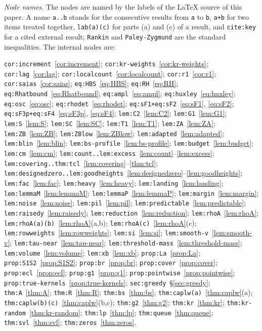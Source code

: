 \emph{Node names.} The nodes are named by the labels of the \LaTeX{} source of this paper. A name \texttt{a..b} stands for the
consecutive results from \texttt{a} to \texttt{b}, \texttt{a+b} for two items treated together, \texttt{lab(a)(c)} for parts (a)
and (c) of a result, and \texttt{cite:key} for a cited external result; \texttt{Rankin} and \texttt{Paley-Zygmund} are the standard
inequalities. The internal nodes are:
{\footnotesize\raggedright
\texttt{cor:increment}~\ref{cor:increment};
\texttt{cor:kr-weights}~\ref{cor:kr-weights};
\texttt{cor:lag}~\ref{cor:lag};
\texttt{cor:localcount}~\ref{cor:localcount};
\texttt{cor:r1}~\ref{cor:r1};
\texttt{cor:saias}~\ref{cor:saias};
\texttt{eq:HBS}~\eqref{eq:HBS};
\texttt{eq:RH}~\eqref{eq:RH};
\texttt{eq:Rhatbound}~\eqref{eq:Rhatbound};
\texttt{eq:ampl}~\eqref{eq:ampl};
\texttt{eq:huxley}~\eqref{eq:huxley};
\texttt{eq:osc}~\eqref{eq:osc};
\texttt{eq:rhodet}~\eqref{eq:rhodet};
\texttt{eq:sF1+eq:sF2}~\ref{eq:sF1}, \ref{eq:sF2};
\texttt{eq:sF3p+eq:sF4}~\ref{eq:sF3p}, \ref{eq:sF4};
\texttt{lem:C2}~\ref{lem:C2};
\texttt{lem:G1}~\ref{lem:G1};
\texttt{lem:S}~\ref{lem:S};
\texttt{lem:SC}~\ref{lem:SC};
\texttt{lem:T1}~\ref{lem:T1};
\texttt{lem:ZA}~\ref{lem:ZA};
\texttt{lem:ZB}~\ref{lem:ZB};
\texttt{lem:ZBlow}~\ref{lem:ZBlow};
\texttt{lem:adapted}~\ref{lem:adapted};
\texttt{lem:blin}~\ref{lem:blin};
\texttt{lem:bs-profile}~\ref{lem:bs-profile};
\texttt{lem:budget}~\ref{lem:budget};
\texttt{lem:cm}~\ref{lem:cm};
\texttt{lem:count..lem:excess}~\ref{lem:count}--\ref{lem:excess};
\texttt{lem:covering..thm:tcl}~\ref{lem:covering}--\ref{thm:tcl};
\texttt{lem:designedzero..lem:goodheights}~\ref{lem:designedzero}--\ref{lem:goodheights};
\texttt{lem:fac}~\ref{lem:fac};
\texttt{lem:heavy}~\ref{lem:heavy};
\texttt{lem:landing}~\ref{lem:landing};
\texttt{lem:lemmaM}~\ref{lem:lemmaM};
\texttt{lem:lemmaP}~\ref{lem:lemmaP};
\texttt{lem:margin}~\ref{lem:margin};
\texttt{lem:noise}~\ref{lem:noise};
\texttt{lem:pil}~\ref{lem:pil};
\texttt{lem:predictable}~\ref{lem:predictable};
\texttt{lem:raisedy}~\ref{lem:raisedy};
\texttt{lem:reduction}~\ref{lem:reduction};
\texttt{lem:rhoA}~\ref{lem:rhoA};
\texttt{lem:rhoA(a)(b)}~\ref{lem:rhoA}(a,b);
\texttt{lem:rhoA(c)}~\ref{lem:rhoA}(c);
\texttt{lem:rowweights}~\ref{lem:rowweights};
\texttt{lem:si}~\ref{lem:si};
\texttt{lem:smooth-v}~\ref{lem:smooth-v};
\texttt{lem:tau-near}~\ref{lem:tau-near};
\texttt{lem:threshold-mass}~\ref{lem:threshold-mass};
\texttt{lem:volume}~\ref{lem:volume};
\texttt{lem:xb}~\ref{lem:xb};
\texttt{prop:La}~\ref{prop:La};
\texttt{prop:S1S2}~\ref{prop:S1S2};
\texttt{prop:br}~\ref{prop:br};
\texttt{prop:cover}~\ref{prop:cover};
\texttt{prop:ecl}~\ref{prop:ecl};
\texttt{prop:g1}~\ref{prop:g1};
\texttt{prop:pointwise}~\ref{prop:pointwise};
\texttt{prop:true-kernels}~\ref{prop:true-kernels};
\texttt{sec:greedy}~\S\ref{sec:greedy};
\texttt{thm:A}~\ref{thm:A};
\texttt{thm:R}~\ref{thm:R};
\texttt{thm:bs}~\ref{thm:bs};
\texttt{thm:caplw(a)}~\ref{thm:caplw}(a);
\texttt{thm:caplw(b)(c)}~\ref{thm:caplw}(b,c);
\texttt{thm:g2}~\ref{thm:g2};
\texttt{thm:kr}~\ref{thm:kr};
\texttt{thm:kr-random}~\ref{thm:kr-random};
\texttt{thm:lp}~\ref{thm:lp};
\texttt{thm:queue}~\ref{thm:queue};
\texttt{thm:svl}~\ref{thm:svl};
\texttt{thm:zeros}~\ref{thm:zeros}.
\par}
